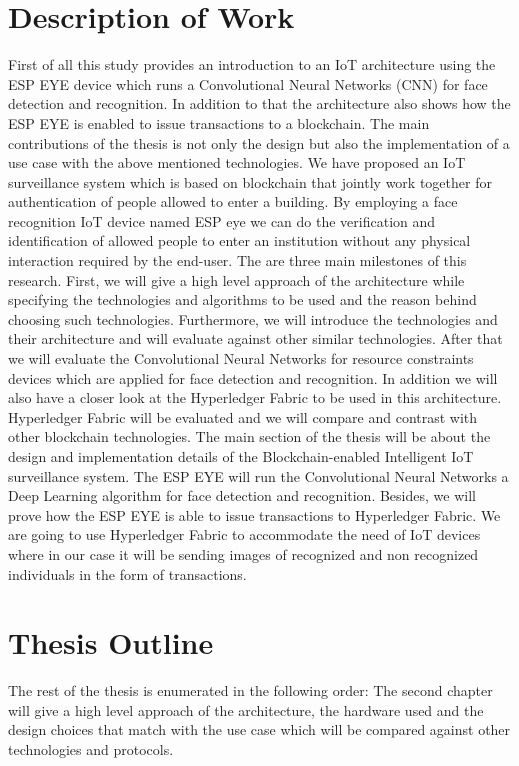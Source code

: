 \section{Description of Work}
First of all this study provides an introduction to an IoT architecture using the ESP EYE device which runs a Convolutional Neural Networks (CNN) for face detection and recognition. In addition to that the architecture also shows how the ESP EYE is enabled to issue transactions to a blockchain. The main contributions of the thesis is not only the design but also the implementation of a use case with the above mentioned technologies. We have proposed an IoT surveillance system which is based on blockchain that jointly work together for authentication of people allowed to enter a building. By employing a face recognition IoT device named ESP eye we can do the verification and identification of allowed people to enter an institution without any physical interaction required by the end-user. The are three main milestones of this research. First, we will give a high level approach of the architecture while specifying the technologies and algorithms to be used and the reason behind choosing such technologies. Furthermore, we will introduce the technologies and their architecture and will evaluate against other similar technologies. After that we will evaluate the Convolutional Neural Networks for resource constraints devices which are applied for face detection and recognition. In addition we will also have a closer look at the Hyperledger Fabric to be used in this architecture. Hyperledger Fabric will be evaluated and we will compare and contrast with other blockchain technologies. 
The main section of the thesis will be about the design and implementation details of the Blockchain-enabled Intelligent IoT surveillance system. The ESP EYE will run the Convolutional Neural Networks a Deep Learning algorithm for face detection and recognition. Besides, we will prove how the ESP EYE is able to issue transactions to Hyperledger Fabric. We are going to use Hyperledger Fabric to accommodate the need of IoT devices where in our case it will be sending images of recognized and non recognized individuals in the form of transactions. 


\section{Thesis Outline}
The rest of the thesis is enumerated in the following order: The second chapter will give a high level approach of the architecture, the hardware used and the design choices that match with the use case which will be compared against other technologies and protocols.

